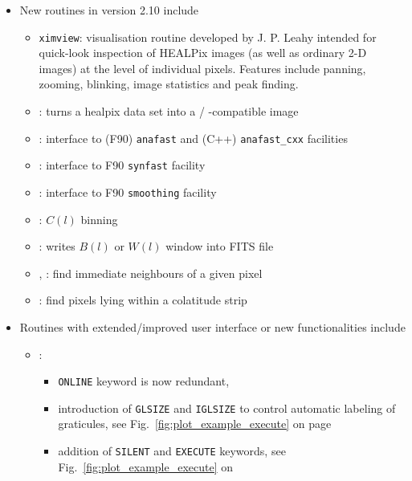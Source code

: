 \documentclass[12pt,twoside]{article}
\begin{document}
{{\begin{itemize}
%
\item New routines in version 2.10 include
\begin{itemize}
 \item {{\tt ximview}}: visualisation routine developed by J. P. Leahy intended for quick-look inspection of HEALPix images 
(as well as ordinary 2-D images) at the level of individual pixels. Features
include panning, zooming, blinking, image statistics and peak finding.
 \item {}: turns a healpix data set into a
%
/%
%
-compatible image
 \item {}: interface to (F90) {\tt anafast}
and (C++) {\tt anafast\_cxx} facilities 
 \item {}: interface to F90 {\tt synfast} facility
 \item {}: interface to F90 {\tt smoothing} facility
 \item {}: $C(l)$ binning
 \item {}: writes $B(l)$ or $W(l)$ window into
FITS file
 \item {}, %
       : %
   find immediate neighbours of a given pixel
 \item {}: %
   find pixels lying within a colatitude strip
\end{itemize}	
%
\item Routines with extended/improved user interface or new functionalities include
\begin{itemize}
\item {}: 
\begin{itemize}
\item {\tt ONLINE} keyword is now redundant, 
\item introduction of {\tt GLSIZE} and {\tt IGLSIZE} to
  	control automatic labeling of graticules,
	see Fig.~\ref{fig:plot_example_execute} on page~\pageref{page:plot_example_execute}
\item addition of {\tt SILENT} and {\tt EXECUTE} keywords,
	see Fig.~\ref{fig:plot_example_execute} on

\end{itemize}
\end{itemize}
\end{itemize}}}
\end{document}
